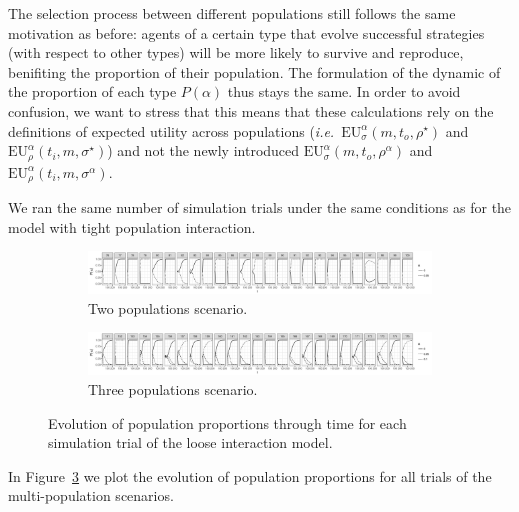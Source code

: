 \documentclass[a4paper]{article}
\begin{document}
The selection process between different populations still follows the same motivation as before: agents of a certain type that evolve successful strategies (with respect to other types) will be more likely to survive and reproduce, benifiting the proportion of their population.
The formulation of the dynamic of the proportion of each type $P(\alpha)$ thus stays the same.
In order to avoid confusion, we want to stress that this means that these calculations rely on the definitions of expected utility across populations (\emph{i.e.}~$\text{EU}_{\sigma}^{\alpha}(m,t_{o},\rho^{\star})$ and $\text{EU}_{\rho}^{\alpha}(t_{i},m,\sigma^{\star})$) and not the newly introduced $\text{EU}_{\sigma}^{\alpha}(m,t_{o},\rho^{\alpha})$ and $\text{EU}_{\rho}^{\alpha}(t_{i},m,\sigma^{\alpha})$.

We ran the same number of simulation trials under the same conditions as for the model with tight population interaction.
\begin{figure}
  \centering
  \begin{subfigure}[]{\textwidth}
    \includegraphics[width=\textwidth]{simulation/results/round-3/plots/proportion-cases-0-005-weakest.png}
    \caption{Two populations scenario.}
    \label{fig:proportion-cases-two-loose-interaction}
  \end{subfigure}
  \hfill
  \begin{subfigure}[]{\textwidth}
    \includegraphics[width=\textwidth]{simulation/results/round-3/plots/proportion-cases-0-005-01-weakest.png}
    \caption{Three populations scenario.}
    \label{fig:proportion-cases-three-loose-interaction}
  \end{subfigure}
  \caption{Evolution of population proportions through time for each simulation trial of the loose interaction model.}
  \label{fig:proportion-cases-loose-interaction}
\end{figure}
In Figure~\ref{fig:proportion-cases-loose-interaction} we plot the evolution of population proportions for all trials of the multi-population scenarios.
\end{document}
